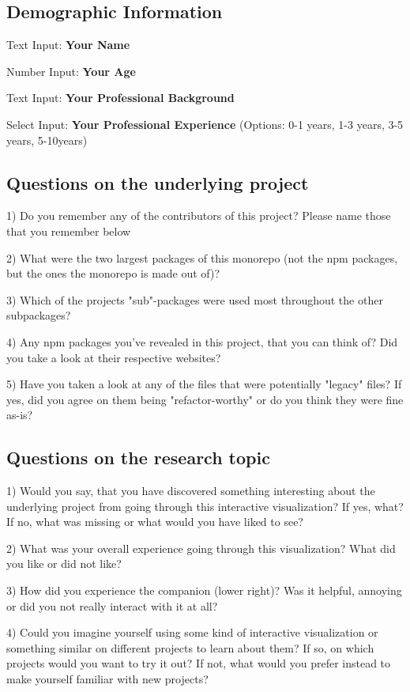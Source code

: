 \begin{appendices}
  \subsection*{Demographic Information}

  Text Input: \textbf{Your Name}

  Number Input: \textbf{Your Age}

  Text Input: \textbf{Your Professional Background}

  Select Input: \textbf{Your Professional Experience} (Options: 0-1 years, 1-3 years, 3-5 years, 5-10years)

  \subsection*{Questions on the underlying project}

  1) Do you remember any of the contributors of this project? Please name those that you remember below

  2) What were the two largest packages of this monorepo (not the npm packages, but the ones the monorepo is made out of)?

  3) Which of the projects "sub"-packages were used most throughout the other subpackages?

  4) Any npm packages you've revealed in this project, that you can think of? Did you take a look at their respective websites?

  5) Have you taken a look at any of the files that were potentially "legacy" files? If yes, did you agree on them being "refactor-worthy" or do you think they were fine as-is?

  \subsection*{Questions on the research topic}

  1) Would you say, that you have discovered something interesting about the underlying project from going through this interactive visualization? If yes, what? If no, what was missing or what would you have liked to see?

  2) What was your overall experience going through this visualization? What did you like or did not like?

  3) How did you experience the companion (lower right)? Was it helpful, annoying or did you not really interact with it at all?

  4) Could you imagine yourself using some kind of interactive visualization or something similar on different projects to learn about them? If so, on which projects would you want to try it out? If not, what would you prefer instead to make yourself familiar with new projects?


\end{appendices}
